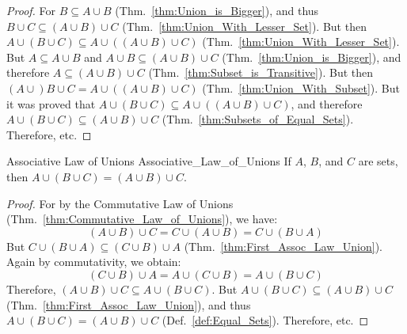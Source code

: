             \begin{proof}
                For $B\subseteq{A}\cup{B}$
                (Thm.~\ref{thm:Union_is_Bigger}), and thus
                $B\cup{C}\subseteq(A\cup{B})\cup{C}$
                (Thm.~\ref{thm:Union_With_Lesser_Set}). But then
                $A\cup(B\cup{C})\subseteq{A}%
                 \cup((A\cup{B})\cup{C})$
                (Thm.~\ref{thm:Union_With_Lesser_Set}).
                But $A\subseteq{A}\cup{B}$ and
                $A\cup{B}\subseteq(A\cup{B})\cup{C}$
                (Thm.~\ref{thm:Union_is_Bigger}), and therefore
                $A\subseteq(A\cup{B})\cup{C}$
                (Thm.~\ref{thm:Subset_is_Transitive}). But then
                $(A\cup)B\cup{C}={A}\cup((A\cup{B})\cup{C})$
                (Thm.~\ref{thm:Union_With_Subset}). But it was
                proved that
                $A\cup(B\cup{C})\subseteq{A}%
                 \cup((A\cup{B})\cup{C})$, and therefore
                $A\cup(B\cup{C})\subseteq(A\cup{B})\cup{C}$
                (Thm.~\ref{thm:Subsets_of_Equal_Sets}).
                Therefore, etc.
            \end{proof}
            \begin{ltheorem}{Associative Law of Unions}
                  {Associative_Law_of_Unions}
                If $A$, $B$, and $C$ are sets, then
                $A\cup(B\cup{C})=(A\cup{B})\cup{C}$.
            \end{ltheorem}
            \begin{proof}
                For by the Commutative Law of Unions
                (Thm.~\ref{thm:Commutative_Law_of_Unions}),
                we have:
                \begin{equation}
                    (A\cup{B})\cup{C}=C\cup(A\cup{B})
                                     =C\cup(B\cup{A})
                \end{equation}
                But $C\cup(B\cup{A})\subseteq(C\cup{B})\cup{A}$
                (Thm.~\ref{thm:First_Assoc_Law_Union}). Again by
                commutativity, we obtain:
                \begin{equation}
                    (C\cup{B})\cup{A}=A\cup(C\cup{B})
                                     =A\cup(B\cup{C})
                \end{equation}
                Therefore,
                $(A\cup{B})\cup{C}\subseteq{A}\cup(B\cup{C})$.
                But $A\cup(B\cup{C})\subseteq(A\cup{B})\cup{C}$
                (Thm.~\ref{thm:First_Assoc_Law_Union}),
                and thus $A\cup(B\cup{C})=(A\cup{B})\cup{C}$
                (Def.~\ref{def:Equal_Sets}). Therefore, etc.
            \end{proof}
